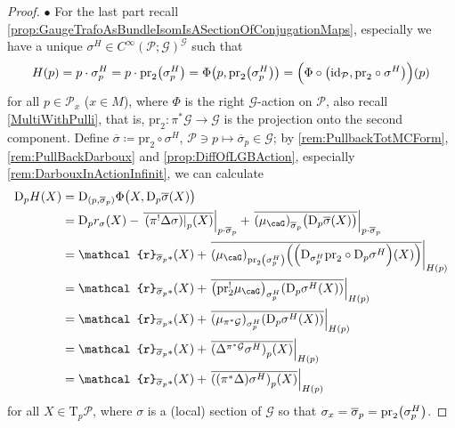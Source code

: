 \documentclass[reqno,a4paper,oneside]{amsart}
\newcommand\mutot{\mu_\caG}
\theoremstyle{plain}
\theoremstyle{remark}
\theoremstyle{definition}
\begin{document}
\begin{proof}
$\bullet$ For the last part recall \ref{prop:GaugeTrafoAsBundleIsomIsASectionOfConjugationMaps}, especially we have a unique $\sigma^H \in C^\infty(\mathcal{P}; \mathcal{G})^{\mathcal{G}}$ such that
\begin{equation*}
H(p)
=
p \cdot \sigma^H_p
=
p \cdot \mathrm{pr}_2\mleft(\sigma^H_p\mright)
=
\Phi\mleft(p, \mathrm{pr}_2\mleft(\sigma^H_p \mright)\mright)
=
\Bigl( \Phi \circ \mleft( \mathrm{id}_{\mathcal{P}}, \mathrm{pr}_2\circ\sigma^H \mright) \Bigr)(p)
\end{equation*}
for all $p \in \mathcal{P}_x$ ($x\in M$), where $\Phi$ is the right $\mathcal{G}$-action on $\mathcal{P}$, also recall \ref{MultiWithPulli}, that is, $\mathrm{pr}_2\colon \pi^*\mathcal{G} \to \mathcal{G}$ is the projection onto the second component. Define $\overline{\sigma} \coloneqq \mathrm{pr}_2 \circ \sigma^H$, $\mathcal{P} \ni p \mapsto \overline{\sigma}_p \in \mathcal{G}$; by \ref{rem:PullbackTotMCForm}, \ref{rem:PullBackDarboux} and \ref{prop:DiffOfLGBAction}, especially \ref{rem:DarbouxInActionInfinit}, we can calculate
\begin{align}\label{DiffOfPrincAutom}
\mathrm{D}_p H(X)
&=
\mathrm{D}_{\mleft(p, \overline{\sigma}_p\mright)}\Phi \bigl( X, \mathrm{D}_p\overline{\sigma}(X) \bigr)
\nonumber
\\
&=
\mathrm{D}_pr_\sigma(X)
	- \mleft.{\overline{ \mleft.\mleft(\pi^!\Delta \sigma\mright)\mright|_p (X)}}\mright|_{p \cdot \overline{\sigma}_p}
	+ \mleft.{\overline{\mleft( \mutot\mright)_{\overline{\sigma}_p} \bigl(\mathrm{D}_p\overline{\sigma}(X) \bigr)}}\mright|_{p \cdot \overline{\sigma}_p}
\nonumber
\\
&=
\mathcal{r}_{\overline{\sigma}_p*}(X)
	+ \mleft.{\overline{\mleft( \mutot\mright)_{\mathrm{pr}_2\mleft(\sigma^H_p\mright)} \mleft(\mleft(\mathrm{D}_{\sigma^H_p}\mathrm{pr}_2 \circ \mathrm{D}_p\sigma^H\mright)(X) \mright)}}\mright|_{H(p)}
\nonumber
\\
&=
\mathcal{r}_{\overline{\sigma}_p*}(X)
	+ \mleft.{\overline{\mleft( \mathrm{pr}_2^!\mutot\mright)_{\sigma^H_p} \mleft(\mathrm{D}_p\sigma^H(X) \mright)}}\mright|_{H(p)}
\nonumber
\\
&=
\mathcal{r}_{\overline{\sigma}_p*}(X)
	+ \mleft.{\overline{\mleft( \mu_{\pi^*\mathcal{G}}\mright)_{\sigma^H_p} \mleft(\mathrm{D}_p\sigma^H(X) \mright)}}\mright|_{H(p)}
\nonumber
\\
&=
\mathcal{r}_{\overline{\sigma}_p*}(X)
	+ \mleft.{\overline{ \mleft(\Delta^{\pi^*\mathcal{G}}\sigma^H\mright)_p(X) }}\mright|_{H(p)}
\nonumber
\\
&=
\mathcal{r}_{\overline{\sigma}_p*}(X)
	+ \mleft.{\overline{ \mleft(\mleft(\pi^*\Delta\mright)\sigma^H\mright)_p(X) }}\mright|_{H(p)}
\end{align}
for all $X \in \mathrm{T}_p\mathcal{P}$, where $\sigma$ is a (local) section of $\mathcal{G}$ so that $\sigma_x = \overline{\sigma}_p = \mathrm{pr}_2\mleft( \sigma^H_p \mright)$.


\end{proof}
\end{document}

